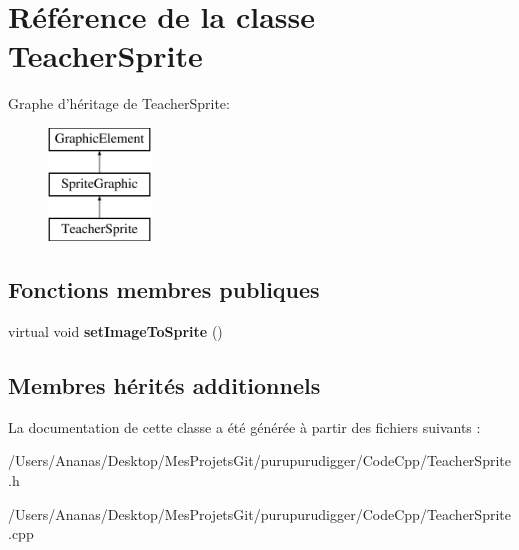 \hypertarget{class_teacher_sprite}{\section{Référence de la classe Teacher\-Sprite}
\label{class_teacher_sprite}
}
Graphe d'héritage de Teacher\-Sprite\-:\begin{figure}[H]
\begin{center}
\leavevmode
\includegraphics[height=3.000000cm]{class_teacher_sprite}
\end{center}
\end{figure}
\subsection*{Fonctions membres publiques}
\begin{DoxyCompactItemize}
\item 
\hypertarget{class_teacher_sprite_af27b172df663abe2bcfca26d7bf0f53c}{virtual void {\bfseries set\-Image\-To\-Sprite} ()}\label{class_teacher_sprite_af27b172df663abe2bcfca26d7bf0f53c}

\end{DoxyCompactItemize}
\subsection*{Membres hérités additionnels}


La documentation de cette classe a été générée à partir des fichiers suivants \-:\begin{DoxyCompactItemize}
\item 
/\-Users/\-Ananas/\-Desktop/\-Mes\-Projets\-Git/purupurudigger/\-Code\-Cpp/Teacher\-Sprite.\-h\item 
/\-Users/\-Ananas/\-Desktop/\-Mes\-Projets\-Git/purupurudigger/\-Code\-Cpp/Teacher\-Sprite.\-cpp\end{DoxyCompactItemize}
